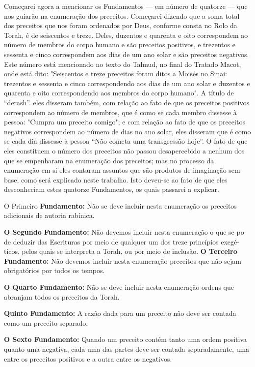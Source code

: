Começarei agora a mencionar os Fundamentos --- em número de qua­torze
--- que nos guiarão na enumeração dos preceitos. Começarei dizendo que a
soma total dos preceitos que nos foram ordenados por Deus, conforme
cons­ta no Rolo da Torah, é de seiscentos e treze. Deles, duzentos e
quarenta e oito correspondem ao número de membros do corpo humano e são
preceitos posi­tivos, e trezentos e sessenta e cinco correspondem aos
dias de um ano solar e são preceitos negativos. Este número está
mencionado no texto do Talmud, no final do Tratado Macot, onde está
dito: "Seiscentos e treze preceitos foram ditos a Moisés no Sinai:
trezentos e sessenta e cinco correspondendo aos dias de um ano solar e
duzentos e quarenta e oito correspondendo aos membros do corpo humano".
A título de ``derash''. eles disseram também, com
relação ao fato de que os preceitos positivos correspondem ao número de
membros, que é como se cada membro dissesse à pessoa: "Cumpra um
preceito comi­go"; e com relação ao fato de que os preceitos negativos
correspondem ao nú­mero de dias no ano solar, eles disseram que é como
se cada dia dissesse à pes­soa ``Não cometa uma transgressão hoje''. O
fato de que eles constituem o nú­mero dos preceitos não passou
desapercebido a nenhum dos que se empenha­ram na enumeração dos
preceitos; mas no processo da enumeração em si eles contaram assuntos
que são produtos de imaginação sem base, como será expli­cado neste
trabalho. Isto deveu-se ao fato de que eles desconheciam estes qua­torze
Fundamentos, os quais passarei a explicar.

O Primeiro \textbf{Fundamento:} Não se deve incluir nesta enumeração os
preceitos adicionais de autoria rabínica.

\textbf{O Segundo Fundamento:} Não devemos incluir nesta enumeração o
que se po­de deduzir das Escrituras por meio de qualquer um dos treze
princípios exegé­ticos, pelos quais se interpreta a Torah, ou por meio
de inclusão.
\textbf{O Terceiro Fundamento:} Não devemos incluir nesta enumeração
preceitos que não sejam obrigatórios por todos os tempos.

\textbf{O Quarto Fundamento:} Não se deve incluir nesta enumeração
ordens que abran­jam todos os preceitos da Torah.

\textbf{Quinto Fundamento:} A razão dada para um preceito não deve ser
 contada como um preceito separado.

\textbf{O Sexto Fundamento:} Quando um preceito contém tanto uma ordem
positiva quanto uma negativa, cada uma das partes deve ser contada
separadamente, uma entre os preceitos positivos e a outra entre os
negativos.

